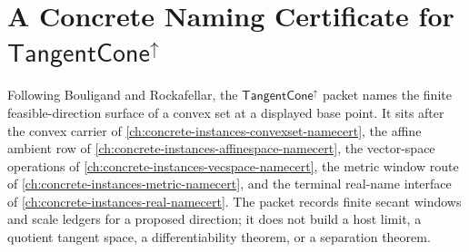 \chapter{A Concrete Naming Certificate for $\mathsf{TangentCone}^{\uparrow}$}
\label{ch:concrete-instances-tangent-cone-namecert}

Following Bouligand and Rockafellar, the $\mathsf{TangentCone}^{\uparrow}$ packet names the finite feasible-direction surface of a convex set at a displayed base point. It sits after the convex carrier of \autoref{ch:concrete-instances-convexset-namecert}, the affine ambient row of \autoref{ch:concrete-instances-affinespace-namecert}, the vector-space operations of \autoref{ch:concrete-instances-vecspace-namecert}, the metric window route of \autoref{ch:concrete-instances-metric-namecert}, and the terminal real-name interface of \autoref{ch:concrete-instances-real-namecert}. The packet records finite secant windows and scale ledgers for a proposed direction; it does not build a host limit, a quotient tangent space, a differentiability theorem, or a separation theorem.

